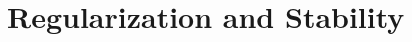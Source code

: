 \chapter{Regularization and Stability}

\begin{ex}
\end{ex}

\begin{ex}
\end{ex}

\begin{ex}
\end{ex}

\begin{ex}
\end{ex}